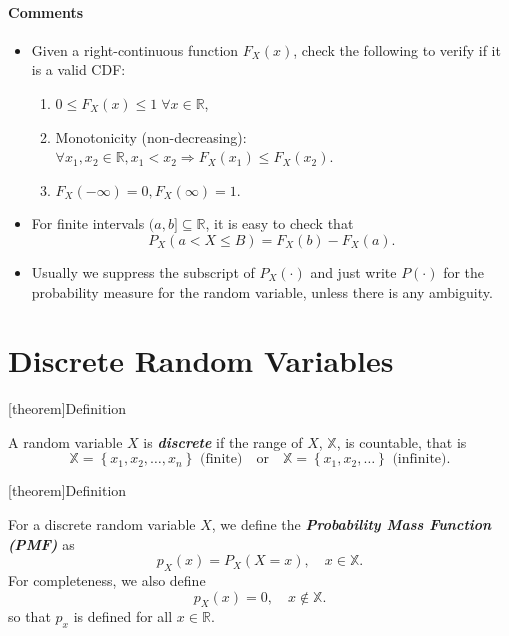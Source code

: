 \documentclass[12pt]{report}
\theoremstyle{definition}
\begin{document}
\paragraph{Comments}
\begin{itemize}
    \item Given a right-continuous function $F_X(x)$, check the following to
        verify if it is a valid CDF:
        \begin{enumerate}[label = (\roman*)]
            \item $0\le F_X(x)\le 1\;\forall x\in\mathbb{R}$,
            \item Monotonicity (non-decreasing):
                $\forall x_1,x_2\in\mathbb{R}, x_1<x_2\Rightarrow F_X(x_1)\le
                F_X(x_2)$.
            \item $F_X(-\infty)=0, F_X(\infty)=1$.
        \end{enumerate} 
    \item For finite intervals $(a,b]\subseteq\mathbb{R}$, it is easy to check
        that 
        \[
            P_X(a<X\le B)=F_X(b)-F_X(a).
        \]
    \item Usually we suppress the subscript of $P_X(\cdot)$ and just write
        $P(\cdot)$ for the probability measure for the random variable, unless
        there is any ambiguity.
\end{itemize} 

\section{Discrete Random Variables}

[theorem]{Definition}
\begin{discrete RV}
    A random variable $X$ is \textbf{\emph{discrete}} if the range of $X$,
    $\mathbb{X}$, is countable, that is
    \[
        \mathbb{X}=\left\{x_1,x_2,\ldots,x_n\right\}\text{ (finite)}
        \quad\text{or}\quad 
        \mathbb{X}=\left\{x_1,x_2,\ldots\right\}\text{ (infinite)}.
    \]
\end{discrete RV}

[theorem]{Definition}
\begin{pmf}
    For a discrete random variable $X$, we define the \textbf{\emph{Probability
    Mass Function (PMF)}} as\[
        p_X(x)=P_X(X=x),\quad x\in\mathbb{X}.
    \]
    For completeness, we also define
    \[
        p_X(x) = 0, \quad x\notin\mathbb{X}.
    \]
    so that $p_x$ is defined for all $x\in\mathbb{R}$.
\end{pmf}
\end{document}
